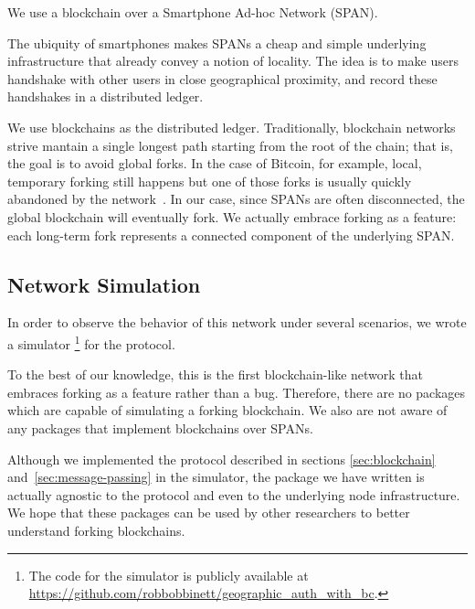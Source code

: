 We use a blockchain over a Smartphone Ad-hoc Network (SPAN).

The ubiquity of smartphones
makes SPANs a cheap and simple underlying infrastructure
that already convey a notion of locality.
The idea is to make users handshake with other users in close geographical proximity,
and record these handshakes in a distributed ledger.

We use blockchains as the distributed ledger.
Traditionally,
blockchain networks strive mantain a single longest path
starting from the root of the chain;
that is,
the goal is to avoid global forks.
In the case of Bitcoin,
for example,
local, temporary forking still happens
but one of those forks is usually quickly abandoned by the network~\cite{decker_2013}.
In our case,
since SPANs are often disconnected,
the global blockchain will eventually fork.
We actually embrace forking as a feature:
each long-term fork represents a connected component of the underlying SPAN.


\subsection{Network Simulation}

In order to observe the behavior of this network under several scenarios,
we wrote a simulator%
\footnote{
	The code for the simulator is publicly available at
	\url{https://github.com/robbobbinett/geographic_auth_with_bc}.
}
for the protocol.

To the best of our knowledge,
this is the first blockchain-like network
that embraces forking as a feature rather than a bug.
Therefore,
there are no packages which are capable of simulating a forking blockchain.
We also are not aware of any packages that implement blockchains over SPANs.

Although we implemented the protocol described in sections
\ref{sec:blockchain} and~\ref{sec:message-passing}
in the simulator,
the package we have written is actually agnostic to the protocol
and even to the underlying node infrastructure.
We hope that these packages can be used by other researchers
to better understand forking blockchains.
